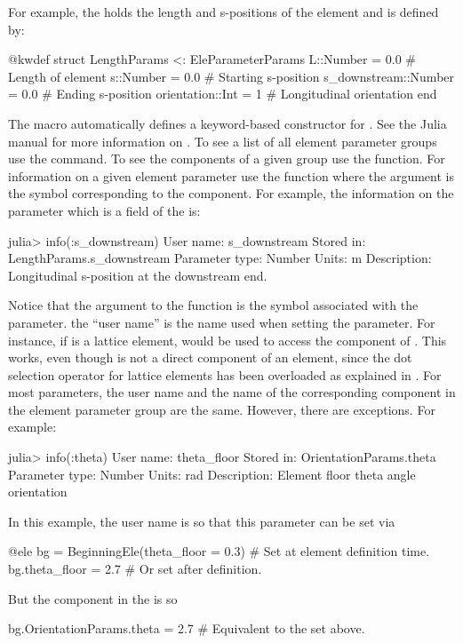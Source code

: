 For example, the  holds the length and s-positions of the element and is defined by:
\begin{example}
  @kwdef struct LengthParams <: EleParameterParams
    L::Number = 0.0               # Length of element
    s::Number = 0.0               # Starting s-position
    s_downstream::Number = 0.0    # Ending s-position
    orientation::Int = 1          # Longitudinal orientation
  end
\end{example}
The  macro automatically defines a keyword-based constructor for .
See the Julia manual for more information on . 
To see a list of all element parameter groups use the  command.
To see the components of a given group use the  function. For information on
a given element parameter use the  function where the argument is the
symbol corresponding to the component. For example, the information on
the  parameter which is a field of the  is:
\begin{example}
  julia> info(:s_downstream)
    User name:       s_downstream
    Stored in:       LengthParams.s_downstream
    Parameter type:  Number
    Units:           m
    Description:     Longitudinal s-position at the downstream end.
\end{example}
Notice that the argument to the  function is the symbol associated with the parameter.
the ``user name'' is the name used when setting the parameter. For instance, if  is a
lattice element,  would be used to access the  component of .
This works, even though  is not a direct component of an element, since the dot
selection operator for lattice elements has been overloaded as explained in .
For most parameters, the user name and the name of the corresponding component in the element parameter
group are the same. However, there are exceptions. For example:
\begin{example}
  julia> info(:theta)
    User name:       theta_floor
    Stored in:       OrientationParams.theta
    Parameter type:  Number
    Units:           rad
    Description:     Element floor theta angle orientation
\end{example}
In this example, the user name is  so that this parameter can be set via
\begin{example}
  @ele bg = BeginningEle(theta_floor = 0.3)    # Set at element definition time.
  bg.theta_floor = 2.7                         # Or set after definition.
\end{example}
But the component in the  is  so
\begin{example}
  bg.OrientationParams.theta = 2.7   # Equivalent to the set above.
\end{example}

